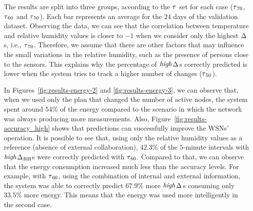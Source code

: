 \documentclass{llncs}
\newcommand{\ourDelta}[2][]{\ensuremath{\Delta\textsuperscript{\text{#1}}
\textsubscript{\text{#2}}}}
\newcommand{\high}[1][ ]{\ensuremath{\text{\emph{high}}#1}}
\newcommand{\highDelta}[2][]{\high{\ourDelta[#1]{#2}}}
\newcommand{\threshold}[1][]{\ensuremath{\tau\textsubscript{#1}}}
\begin{document}
\begin{comment}
To show better the benefits of the developed solution, we represent the 
collected results together with two baseline scenarios that did not use 
collaboration. In the first scenario the nodes always produced less 
measurements, and the opposite in the second one. Thus, by using them, we can 
show the lowest and the highest possible energy consumption values. An 
important remark is that these two scenarios always have $p = 0$, since either 
they did not save any energy (the highest consumption plan case) or their 
accuracy of detecting \highDelta{}s was zero (the lowest consumption plan case). 
Therefore, these plans can be considered as references and give some idea about 
how much our solution was able to exploit the trade-off between the two 
extremes.
\end{comment}

The results are split into three groups, according to the \threshold{} set for 
each case (\threshold[70], \threshold[60] and \threshold[50]). Each bar 
represents an average for the $24$ days of the validation dataset. Observing the 
data, we can see that the correlation between temperature and relative humidity 
values is closer to $-1$ when we consider only the highest \ourDelta{}s, i.e., 
\threshold[70]. Therefore, we assume that there are other factors that may 
influence the small variations in the relative humidity, such as the presence of 
persons close to the sensors. This explains why the percentage of \highDelta{}s 
correctly predicted is lower when the system tries to track a higher number of 
changes (\threshold[50]).



In Figures~\ref{fig:results-energy-2} and \ref{fig:results-energy-3}, we 
can observe that, when we used only the plan that changed the number of active 
nodes, the system spent around $54\%$ of the energy compared to the scenario in 
which the network was always producing more measurements. Also, 
Figure~\ref{fig:results-accuracy_high} shows that predictions can successfully 
improve the WSNs' operation. It is possible to see that, using only the relative 
humidity values as a reference (absence of external collaboration), $42.3\%$ of 
the $5$-minute intervals with \highDelta{RH}s were correctly predicted with 
\threshold[60]. Compared to that, we can observe that the energy consumption 
increased much less than the accuracy levels. For example, with \threshold[60], 
using the combination of internal and external information, the system was able 
to correctly predict $67.9\%$ more \highDelta{}s consuming only $33.5\%$ more 
energy. This means that the energy was used more intelligently in the second 
case.
\end{document}
